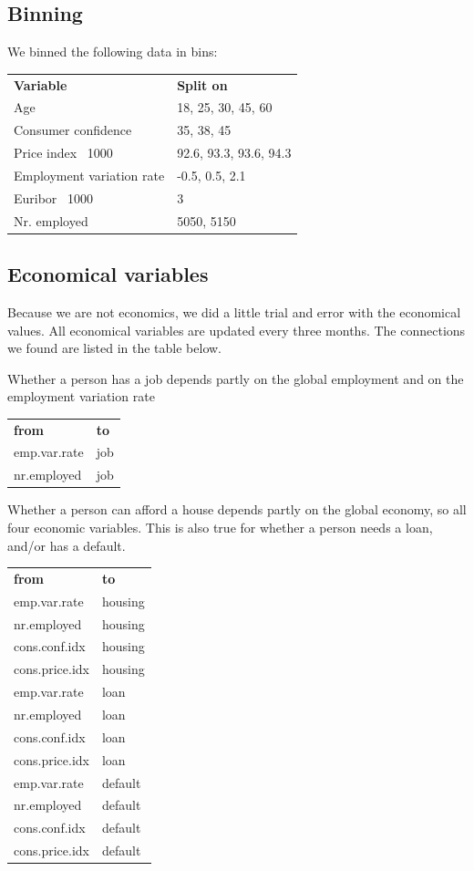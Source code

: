 \documentclass[11pt]{article}
\begin{document}
\begin{multicols}{2}
\subsection{Binning}
We binned the following data in bins:

\medskip
\begin{tabular}{ll}
    \textbf{Variable}           & \textbf{Split on} \\
    Age                         & 18, 25, 30, 45, 60 \\
    Consumer confidence         & 35, 38, 45 \\
    Price index \ 1000          & 92.6, 93.3, 93.6, 94.3 \\
    Employment variation rate   & -0.5, 0.5, 2.1 \\
    Euribor \ 1000              & 3 \\
    Nr. employed                & 5050, 5150 \\
\end{tabular}

\subsection{Economical variables}
Because we are not economics, we did a little trial and error with the
economical values. All economical variables are updated every three months. The
connections we found are listed in the table below. 

\bigskip
Whether a person has a job depends partly on the global employment and on the
employment variation rate

\medskip
\begin{tabular}{ll}
    \textbf{from} & \textbf{to} \\
    emp.var.rate & job\\
    nr.employed & job 
\end{tabular}

\bigskip
Whether a person can afford a house depends partly on the global economy, so all
four economic variables. This is also true for whether a person needs a loan,
and/or has a default. 

\medskip
\begin{tabular}{ll}
    \textbf{from} & \textbf{to} \\
    emp.var.rate & housing \\
    nr.employed & housing \\ 
    cons.conf.idx & housing \\ 
    cons.price.idx & housing \\ 
    \medskip
    emp.var.rate & loan \\
    nr.employed & loan \\ 
    cons.conf.idx & loan \\ 
    cons.price.idx & loan \\
    \medskip
    emp.var.rate & default \\
    nr.employed & default \\ 
    cons.conf.idx & default \\ 
    cons.price.idx & default \\ 
\end{tabular}


\end{multicols}
\end{document}
